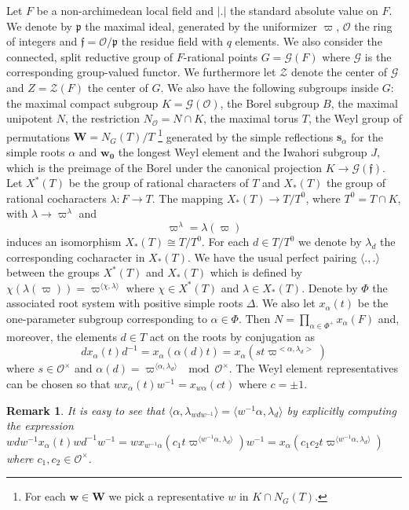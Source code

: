 \documentclass{article}
\newtheorem{remark}{Remark}
\begin{document}
Let $F$ be a non-archimedean local field and $|.|$ the standard absolute value on $F$. We denote by $\mathfrak{p}$ the maximal ideal, generated by the uniformizer $\varpi$, $\mathcal{O}$ the ring of integers and $\mathfrak{f}=\mathcal{O}/\mathfrak{p}$ the residue field with $q$ elements. We also consider the connected, split reductive group of $F$-rational points $G=\mathcal{G}(F)$ where $\mathcal{G}$ is the corresponding group-valued functor. We furthermore let $\mathcal{Z}$ denote the center of $\mathcal{G}$ and $Z=\mathcal{Z}(F)$ the center of $G$. We also have the following subgroups inside $G$:
 the maximal compact subgroup $K=\mathcal{G}(\mathcal{O})$,
 the Borel subgroup $B$,
 the maximal unipotent $N$,
 the restriction $N_{\mathcal{O}}=N\cap K$,
 the maximal torus $T$,
 the Weyl group of permutations $\mathbf{W}=N_G(T)/T$ \footnote{For each $\mathbf{w}\in\mathbf{W}$ we pick a representative $w$ in $K\cap N_G(T)$.} generated by the simple reflections $\mathbf{s}_{\alpha}$ for the simple roots $\alpha$ and $\mathbf{w_0}$ the longest Weyl element and 
 the Iwahori subgroup $J$, which is the preimage of the Borel under the canonical projection $K\to\mathcal{G}(\mathfrak{f})$.
 Let $X^*(T)$ be the group of rational characters of $T$ and $X_*(T)$ the group of rational cocharacters $\lambda:F\to T$. The mapping $X_*(T)\to T/T^0$, where $T^0=T\cap K$, with $\lambda\to\varpi^{\lambda}$ and $$\varpi^{\lambda}=\lambda(\varpi)$$ induces an isomorphism $X_*(T)\cong T/T^0$. For each $d\in T/T^0$ we denote by $\lambda_d$ the corresponding cocharacter in $X_*(T)$. We have the usual perfect pairing $\langle.,.\rangle$ between the groups $X^*(T)$ and $X_*(T)$ which is defined by $\chi(\lambda(\varpi))=\varpi^{\langle\chi,\lambda\rangle}$ where $\chi\in X^*(T)$ and $\lambda\in X_*(T)$.
 Denote by $\Phi$ the associated root system with positive simple roots $\Delta$. We also let $x_{\alpha}(t)$ be the one-parameter subgroup corresponding to $\alpha\in\Phi$. Then $N=\prod\limits_{\alpha\in\Phi^+}x_{\alpha}(F)$ and, moreover, the elements $d\in T$ act on the roots by conjugation as \begin{equation}dx_{\alpha}(t)d^{-1}=x_{\alpha}(\alpha(d)t)=x_{\alpha}(st \varpi^{<\alpha, \lambda_d>} )\label{actroot}\end{equation}  where $s\in\mathcal{O}^{\times}$ and $\alpha(d)=\varpi^{\langle\alpha,\lambda_d\rangle}\mod\mathcal{O}^{\times}$. The Weyl element representatives can be chosen so that $wx_{\alpha}(t)w^{-1}=x_{w\alpha}(ct)$ where $c=\pm1$.
 \begin{remark}\label{rem1}
     It is easy to see that $\langle\alpha,\lambda_{wdw^{-1}}\rangle=\langle w^{-1}\alpha,\lambda_d \rangle$ by explicitly computing the expression $wdw^{-1}x_{\alpha}(t)wd^{-1}w^{-1}=wx_{w^{-1}\alpha}(c_1t\varpi^{\langle w^{-1}\alpha,\lambda_d\rangle})w^{-1}=x_{\alpha}(c_1c_2t\varpi^{\langle w^{-1}\alpha,\lambda_d\rangle})$ where $c_1,c_2\in\mathcal{O}^{\times}$.
 \end{remark}
\end{document}
